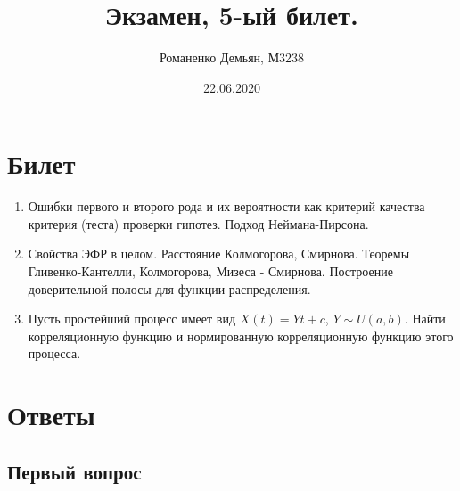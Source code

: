 \documentclass{article}
\title{\textbf{Экзамен, 5-ый билет.}}
\author{Романенко Демьян, М3238}
\date{22.06.2020}
\begin{document}
	\maketitle
	\newpage

\maketitle
    \section{Билет}
        \begin{enumerate}
            \item Ошибки первого и второго рода и их вероятности как критерий качества критерия (теста) проверки гипотез. Подход Неймана-Пирсона.
            \item Свойства ЭФР в целом. Расстояние Колмогорова, Смирнова. Теоремы Гливенко-Кантелли, Колмогорова, Мизеса - Смирнова. Построение доверительной полосы для функции распределения.
            \item Пусть простейший процесс имеет вид $X(t) = Y t + c$, $Y \sim U(a, b)$. Найти корреляционную функцию и нормированную корреляционную функцию этого процесса.
        \end{enumerate}
    \section{Ответы}
    \subsection{Первый вопрос}
\end{document}
